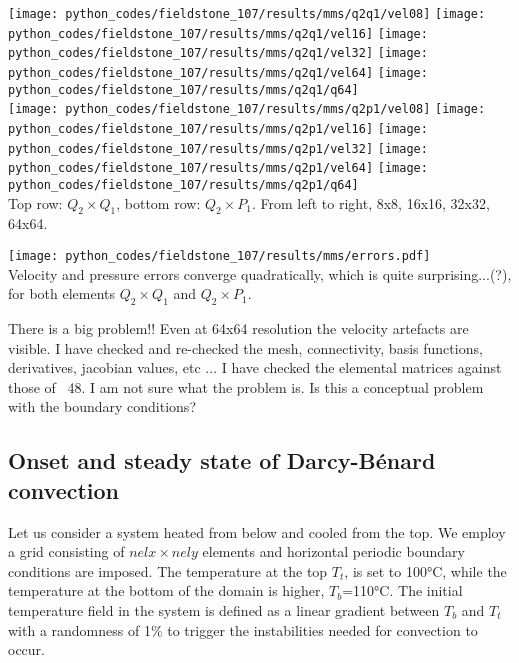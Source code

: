 \begin{center}
\texttt{[image: python\_codes/fieldstone\_107/results/mms/q2q1/vel08]}
\texttt{[image: python\_codes/fieldstone\_107/results/mms/q2q1/vel16]}
\texttt{[image: python\_codes/fieldstone\_107/results/mms/q2q1/vel32]}
\texttt{[image: python\_codes/fieldstone\_107/results/mms/q2q1/vel64]}
\texttt{[image: python\_codes/fieldstone\_107/results/mms/q2q1/q64]}\\
\texttt{[image: python\_codes/fieldstone\_107/results/mms/q2p1/vel08]}
\texttt{[image: python\_codes/fieldstone\_107/results/mms/q2p1/vel16]}
\texttt{[image: python\_codes/fieldstone\_107/results/mms/q2p1/vel32]}
\texttt{[image: python\_codes/fieldstone\_107/results/mms/q2p1/vel64]}
\texttt{[image: python\_codes/fieldstone\_107/results/mms/q2p1/q64]}\\
{\captionfont Top row: $Q_2\times Q_1$, bottom row: $Q_2\times P_1$. From left to right, 8x8,
16x16, 32x32, 64x64. }
\end{center}

\begin{center}
\texttt{[image: python\_codes/fieldstone\_107/results/mms/errors.pdf]}\\
{\captionfont Velocity and pressure errors converge quadratically, which is quite
surprising...(?), for both elements $Q_2\times Q_1$ and $Q_2\times P_1$.}
\end{center}

{\color{orange} There is a big problem!! Even at 64x64 resolution the velocity artefacts 
are visible. I have checked and re-checked the mesh, connectivity, basis functions, 
derivatives, jacobian values, etc ... I have checked the elemental matrices against those of 
\stone~48. I am not sure what the problem is. Is this a conceptual
problem with the boundary conditions? }





\subsection*{Onset and steady state of Darcy-B\'enard convection}

Let us consider a system heated from below and cooled from the top. We employ a 
grid consisting of $nelx\times nely$ elements and horizontal periodic boundary conditions are imposed. 
The temperature at the top $T_t$, is set to 100\si{\celsius}, while the temperature at the 
bottom of the domain is higher, $T_b$=110\si{\celsius}. The initial temperature field in the system is defined 
as a linear gradient between $T_b$ and $T_t$ with a randomness of 1\% to trigger the 
instabilities needed for convection to occur. 

